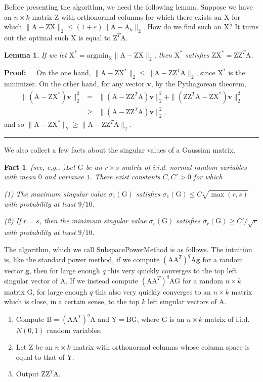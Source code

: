 \documentclass[11pt]{article}
\newtheorem{lemma}[theorem]{Lemma}
\newenvironment{proof}{\begin{trivlist} \item {\bf Proof:~~}}
  {\qed\end{trivlist}}
\newcommand{\mat}[1]{{\ensuremath{\bm{\mathrm{#1}}}}}
\def\ve{{\mathbf v}}
\def\matA{\mat{A}}
\def\matB{\mat{B}}
\def\matG{\mat{G}}
\def\matX{\mat{X}}
\def\matY{\mat{Y}}
\def\matZ{\mat{Z}}
\def\qed{\hfill\rule{2mm}{2mm}}
\def\g{{\mathbf g}}
\newcommand{\eps}{\varepsilon}
\newtheorem{fact}{Fact}
\begin{document}
Before presenting the algorithm, we need the following lemma. 
Suppose we have an $n \times k$ matriz $\matZ$ with orthonormal
columns for which there exists an $\matX$ for which $\|\matA-\matZ\matX\|_2 \leq (1+\eps)\|\matA-\matA_k\|_2$. How do we find
such an $\matX$? It turns out the optimal such $\matX$ is equal to $\matZ^T \matA$.

\begin{lemma}\label{lem:kinside}
If we let $\matX^* = \textrm{argmin}_{\matX} \|\matA-\matZ\matX\|_2$, then $\matX^*$ 
satisfies $\matZ\matX^* = \matZ\matZ^T \matA$. 
\end{lemma} 
\begin{proof}
On the one hand, $\|\matA-\matZ\matX^*\|_2 \leq \|\matA-\matZ\matZ^T \matA\|_2$, since $\matX^*$ is the minimizer. On the other hand,
for any vector $\ve$, by the Pythagorean theorem, 
\begin{eqnarray*}
\|(\matA-\matZ\matX^*)\ve\|_2^2 & = & \|(\matA-\matZ\matZ^T\matA)\ve\|_2^2 + \|(\matZ\matZ^T\matA - \matZ\matX^*)\ve\|_2^2\\
& \geq & \|(\matA-\matZ\matZ^T\matA)\ve\|_2^2,
\end{eqnarray*}
and so $\|\matA-\matZ\matX^*\|_2 \geq \|\matA-\matZ\matZ^T\matA\|_2$. 
\end{proof}
We also collect a few facts about the singular values of a Gaussian matrix. 
\begin{fact}(see, e.g., \cite{RV10})\label{fact:gaussian}
Let $\matG$ be an $r \times s$ matrix of i.i.d. normal random variables with mean $0$ and variance $1$. 
There exist constants $C, C' > 0$ for which

(1) The maximum singular value $\sigma_1(\matG)$ satisfies $\sigma_1(\matG) \leq C\sqrt{\max(r,s)}$ with
probability at least $9/10$. 

(2) If $r = s$, then the minimum singular value $\sigma_r(\matG)$ satisfies 
$\sigma_r(\matG) \geq C'/\sqrt{r}$ with probability at least $9/10$.
\end{fact}

The algorithm, which we call {\sf SubspacePowerMethod} is as follows. The intuition is, like
the standard power method, if we compute $(\matA \matA^T)^q \matA \g$ for a 
random vector $\g$, then for large
enough $q$ this very quickly converges to the top left singular vector of $\matA$. If we instead
compute $(\matA \matA^T)^q \matA \matG$ for a random $n \times k$ matrix $\matG$, for large
enough $q$ this also very quickly converges to an $n \times k$ matrix which is close, in a certain
sense, to the top $k$ left singular vectors of $\matA$. 
\begin{enumerate}
\item Compute $\matB = (\matA\matA^T)^q \matA$ and $\matY = \matB\matG$, where $\matG$ 
is an $n \times k$ matrix of i.i.d. $N(0,1)$ random variables.
\item Let $\matZ$ be an $n \times k$ matrix with orthonormal columns whose column space is equal to that of $\matY$.
\item Output $\matZ\matZ^T \matA$. 
\end{enumerate}
\end{document}
